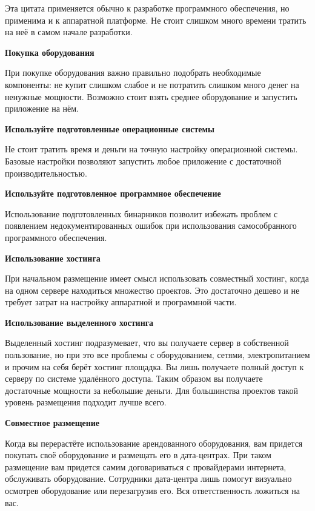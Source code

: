 Эта цитата применяется обычно к разработке программного обеспечения, но применима и к аппаратной платформе. Не стоит слишком много времени тратить на неё в самом начале разработки.

\textbf{Покупка оборудования}

При покупке оборудования важно правильно подобрать необходимые компоненты: не купит слишком слабое и не потратить слишком много денег на ненужные мощности. Возможно стоит взять среднее оборудование и запустить приложение на нём.


\textbf{Используйте подготовленные операционные системы}

Не стоит тратить время и деньги на точную настройку операционной системы. Базовые настройки позволяют запустить любое приложение с достаточной производительностью.

\textbf{Используйте подготовленное программное обеспечение}

Использование подготовленных бинарников позволит избежать проблем с появлением недокументированных ошибок при использования самособранного программного обеспечения.



\textbf{ Использование хостинга } %

При начальном размещение имеет смысл использовать совместный хостинг, когда на одном сервере находиться множество проектов. Это достаточно дешево и не требует затрат на настройку аппаратной и программной части.


\textbf{ Использование выделенного хостинга } %

Выделенный хостинг подразумевает, что вы получаете сервер в собственной пользование, но при это все проблемы с оборудованием, сетями, электропитанием и прочим на себя берёт хостинг площадка. Вы лишь получаете полный доступ к серверу по системе удалённого доступа. Таким образом вы получаете достаточные мощности за небольшие деньги. Для большинства проектов такой уровень размещения подходит лучше всего.

\textbf{ Совместное размещение } %

Когда вы перерастёте использование арендованного оборудования, вам придется покупать своё оборудование и размещать его в дата-центрах. При таком размещение вам придется самим договариваться с провайдерами интернета, обслуживать оборудование. Сотрудники дата-центра лишь помогут визуально осмотрев оборудование или перезагрузив его. Вся ответственность ложиться на вас.

